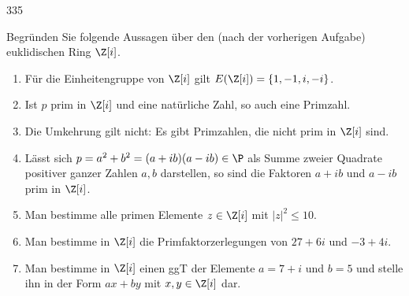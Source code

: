 \begin{algebraUE}{335}

Begründen Sie folgende Aussagen über den (nach der vorherigen Aufgabe) euklidischen Ring $\Z [i]$.

\begin{enumerate}
  \item Für die Einheitengruppe von $\Z [i]$ gilt $E(\Z [i]) = \{1,-1,i,-i\}$.

  \item Ist $p$ prim in $\Z [i]$ und eine natürliche Zahl, so auch eine Primzahl.

  \item Die Umkehrung gilt nicht: Es gibt Primzahlen, die nicht prim in $\Z [i]$ sind.

  \item Lässt sich $p = a^2 + b^2 = (a+ib)(a-ib) \in \P$ als Summe zweier Quadrate positiver ganzer Zahlen $a,b$ darstellen, so sind die Faktoren $a+ib$ und $a-ib$ prim in $\Z [i]$.

  \item Man bestimme alle primen Elemente $z \in \Z[i]$ mit $|z|^2 \leq 10$.

  \item Man bestimme in $\Z [i]$ die Primfaktorzerlegungen von $27+6i$ und $-3+4i$.

  \item Man bestimme in $\Z [i]$ einen ggT der Elemente $a = 7+i$ und $b=5$ und stelle ihn in der Form $ax + by$ mit $x,y \in \Z [i]$ dar.

\end{enumerate}

\end{algebraUE}

